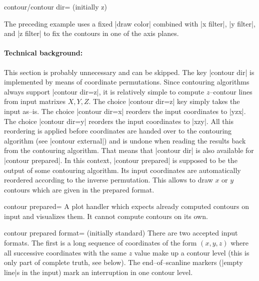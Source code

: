 {{\begin{pgfplotskey}{contour/contour dir= (initially z)}
\begin{codeexample}[]
\end{codeexample}
	\noindent The preceding example uses a fixed |draw color| combined with |x filter|, |y filter|, and |z filter| to fix the contours in one of the axis planes.

	\paragraph{Technical background:} This section is probably unnecessary and can be skipped. The key |contour dir| is implemented by means of coordinate permutations. Since contouring algorithms always support |contour dir=z|, it is relatively simple to compute $z$--contour lines from input matrixes $X, Y, Z$. The choice |contour dir=z| key simply takes the input as--is. The choice |contour dir=x| reorders the input coordinates to |yzx|. The choice |contour dir=y| reorders the input coordinates to |xzy|. All this reordering is applied before coordinates are handed over to the contouring algorithm (see |contour external|) and is undone when reading the results back from the contouring algorithm. That means that |contour dir| is also available for |contour prepared|. In this context, |contour prepared| is supposed to be the output of some contouring algorithm. Its input coordinates are automatically reordered according to the inverse permutation. This allows to draw $x$ or $y$ contours which are given in the prepared format.
\end{pgfplotskey}

\begin{plottype}[/pgfplots]{contour prepared=\textcolor{black}{}}
	A plot handler which expects already computed contours on input and visualizes them. It cannot compute contours on its own.

	\begin{pgfplotskey}{contour prepared format= (initially standard)}
	There are two accepted input formats. The first is a long sequence of coordinates of the form $(x,y,z)$ where all successive coordinates with the same $z$ value make up a contour level (this is only part of complete truth, see below). The end--of--scanline markers (|empty line|s in the input) mark an interruption in one contour level.


\end{pgfplotskey}
\end{plottype}}}
